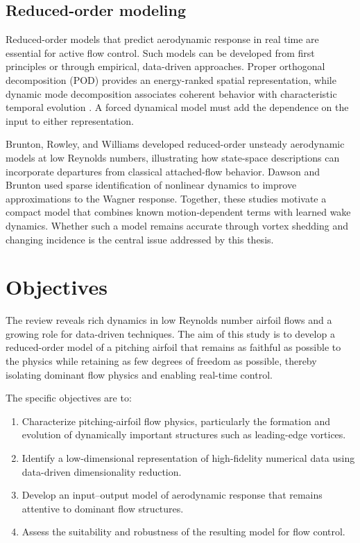 \subsection{Reduced-order modeling}
Reduced-order models that predict aerodynamic response in real time are essential for active flow control. Such models can be developed from first principles or through empirical, data-driven approaches. Proper orthogonal decomposition (POD) provides an energy-ranked spatial representation, while dynamic mode decomposition associates coherent behavior with characteristic temporal evolution \cite{bruntonbook,mlfluids}. A forced dynamical model must add the dependence on the input to either representation.

Brunton, Rowley, and Williams \cite{brunton2013} developed reduced-order unsteady aerodynamic models at low Reynolds numbers, illustrating how state-space descriptions can incorporate departures from classical attached-flow behavior. Dawson and Brunton \cite{dawson} used sparse identification of nonlinear dynamics to improve approximations to the Wagner response. Together, these studies motivate a compact model that combines known motion-dependent terms with learned wake dynamics. Whether such a model remains accurate through vortex shedding and changing incidence is the central issue addressed by this thesis.

\section{Objectives}
The review reveals rich dynamics in low Reynolds number airfoil flows and a growing role for data-driven techniques. The aim of this study is to develop a reduced-order model of a pitching airfoil that remains as faithful as possible to the physics while retaining as few degrees of freedom as possible, thereby isolating dominant flow physics and enabling real-time control.

The specific objectives are to:
\begin{enumerate}
\item Characterize pitching-airfoil flow physics, particularly the formation and evolution of dynamically important structures such as leading-edge vortices.
\item Identify a low-dimensional representation of high-fidelity numerical data using data-driven dimensionality reduction.
\item Develop an input--output model of aerodynamic response that remains attentive to dominant flow structures.
\item Assess the suitability and robustness of the resulting model for flow control.
\end{enumerate}

